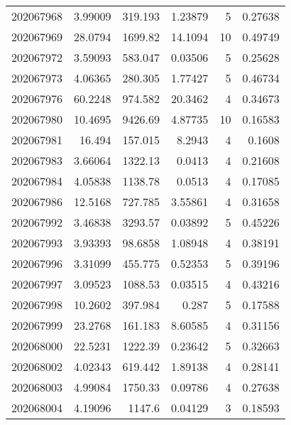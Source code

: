 \begin{tabular}{rrrrrr}
 202067968 &          3.99009 &      319.193  &            1.23879 &           5 & 0.27638 \\
 202067969 &         28.0794  &     1699.82   &           14.1094  &          10 & 0.49749 \\
 202067972 &          3.59093 &      583.047  &            0.03506 &           5 & 0.25628 \\
 202067973 &          4.06365 &      280.305  &            1.77427 &           5 & 0.46734 \\
 202067976 &         60.2248  &      974.582  &           20.3462  &           4 & 0.34673 \\
 202067980 &         10.4695  &     9426.69   &            4.87735 &          10 & 0.16583 \\
 202067981 &         16.494   &      157.015  &            8.2943  &           4 & 0.1608  \\
 202067983 &          3.66064 &     1322.13   &            0.0413  &           4 & 0.21608 \\
 202067984 &          4.05838 &     1138.78   &            0.0513  &           4 & 0.17085 \\
 202067986 &         12.5168  &      727.785  &            3.55861 &           4 & 0.31658 \\
 202067992 &          3.46838 &     3293.57   &            0.03892 &           5 & 0.45226 \\
 202067993 &          3.93393 &       98.6858 &            1.08948 &           4 & 0.38191 \\
 202067996 &          3.31099 &      455.775  &            0.52353 &           5 & 0.39196 \\
 202067997 &          3.09523 &     1088.53   &            0.03515 &           4 & 0.43216 \\
 202067998 &         10.2602  &      397.984  &            0.287   &           5 & 0.17588 \\
 202067999 &         23.2768  &      161.183  &            8.60585 &           4 & 0.31156 \\
 202068000 &         22.5231  &     1222.39   &            0.23642 &           5 & 0.32663 \\
 202068002 &          4.02343 &      619.442  &            1.89138 &           4 & 0.28141 \\
 202068003 &          4.99084 &     1750.33   &            0.09786 &           4 & 0.27638 \\
 202068004 &          4.19096 &     1147.6    &            0.04129 &           3 & 0.18593 \\

\end{tabular}
